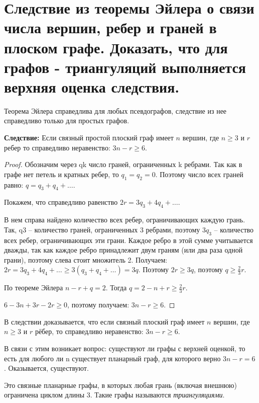 \section{Следствие из теоремы Эйлера о связи числа вершин, ребер и граней в плоском графе.  Доказать, 
что для графов - триангуляций выполняется верхняя оценка следствия.}

Теорема Эйлера справедлива для любых псевдографов, следствие из нее
справедливо только для простых графов.

\textbf{Следствие:}
Если связный простой плоский граф имеет $n$ вершин, где $n \geq 3$ и
$r$ ребер то справедливо неравенство: $3n - r \geq 6$.

\begin{proof}
    Обозначим через qk число граней, ограниченных k ребрами.
    Так как в графе нет петель и кратных ребер, то $q_1 = q_2 = 0$. Поэтому число всех
    граней равно: $q = q_3 + q_4 + \dots$.

    Покажем, что справедливо равенство $2r = 3q_3 + 4q_4 + \dots$.

    В нем справа найдено количество всех ребер, ограничивающих каждую
    грань. Так, q3 – количество граней, ограниченных 3 ребрами, поэтому $3q_3$ --
    количество всех ребер, ограничивающих эти грани. Каждое ребро в этой
    сумме учитывается дважды, так как каждое ребро принадлежит двум граням
    (или два раза одной грани), поэтому слева стоит множитель 2.
    Получаем: $2r = 3q_3 + 4q_4 + \dots \geq 3(q_3 + q_4 + \dots) = 3q$.
    Поэтому $2r \geq 3q$, поэтому $q \geq \frac{2}{3}r$.

    По теореме Эйлера $n-r+q=2$. Тогда $q = 2 - n + r \geq \frac{2}{3}r$.

    $6 - 3n + 3r - 2r \geq 0$, поэтому получаем: $3n - r \geq 6$.
\end{proof}

В следствии доказывается, что если связный плоский граф имеет
$n$ вершин, где $n \geq 3$ и $r$ рёбер, то справедливо неравенство: $3n - r \geq 6$.

В связи с этим возникает вопрос: существуют ли графы с верхней оценкой,
то есть для любого ли n существует планарный граф, для которого верно
$3n - r = 6$. Оказывается, существуют.

\begin{definition}
    Это связные планарные графы, в которых любая грань (включая внешнюю)
    ограничена циклом длины 3. Такие графы называются \textit{триангуляциями}.
\end{definition}

